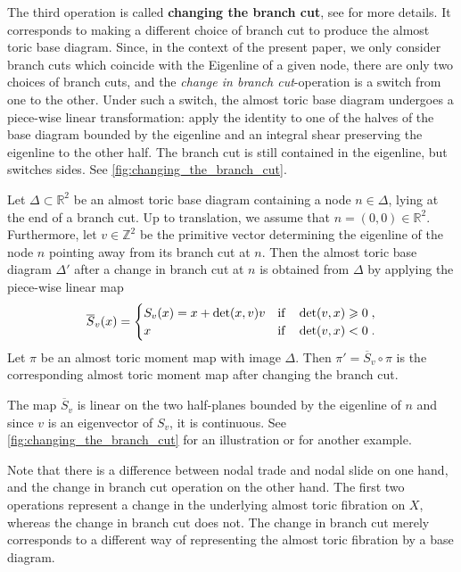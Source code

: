 \documentclass[12pt,a4paper,abstract=true,draft]{scrartcl}
\begin{document}
The third operation is called \textbf{changing the branch cut}, see \cite[Sections 8.4]{evans2021atfs} for more details.
It corresponds to making a different choice of branch cut to produce the almost toric base diagram.
Since, in the context of the present paper, we only consider branch cuts which coincide with the Eigenline of a given node, there are only two choices of branch cuts, and the \textit{change in branch cut}-operation is a switch from one to the other.
Under such a switch, the almost toric base diagram undergoes a piece-wise linear transformation: apply the identity to one of the halves of the base diagram bounded by the eigenline and an integral shear preserving the eigenline to the other half.
The branch cut is still contained in the eigenline, but switches sides. See \cref{fig:changing_the_branch_cut}.

\begin{proposition}
    \label{thm:change_branchcut}
    Let $\Delta \subset \mathbb{R}^2$ be an almost toric base diagram containing a node $n \in \Delta$, lying at the end of a branch cut.
Up to translation, we assume that $n = (0,0) \in \mathbb{R}^2$.
Furthermore, let $v \in \mathbb{Z}^2$ be the primitive vector determining the eigenline of the node $n$ pointing away from its branch cut at $n$.
Then the almost toric base diagram $\Delta'$ after a change in branch cut at $n$ is obtained from $\Delta$ by applying the piece-wise linear map 
    \begin{equation}
    \label{eq:half-shear}
        \overline{S}_v(x) =
        \begin{cases}
            S_v(x) = x + \det(x,v)v & \qif* \det(v,x) \geqslant 0 \;, \\
            x & \qif* \det(v,x) < 0 \;.
        \end{cases}
    \end{equation}
    Let $\pi$ be an almost toric moment map with image $\Delta$.
Then $\pi' = \overline{S}_v \circ \pi$ is the corresponding almost toric moment map after changing the branch cut.
\end{proposition}

The map $\overline{S}_v$ is linear on the two half-planes bounded by the eigenline of $n$ and since $v$ is an eigenvector of $S_v$, it is continuous.
See \cref{fig:changing_the_branch_cut} for an illustration or \cite[Example 8.15]{evans2021atfs} for another example.

Note that there is a difference between nodal trade and nodal slide on one hand, and the change in branch cut operation on the other hand.
The first two operations represent a change in the underlying almost toric fibration on $X$, whereas the change in branch cut does not.
The change in branch cut merely corresponds to a different way of representing the almost toric fibration by a base diagram.
\end{document}
